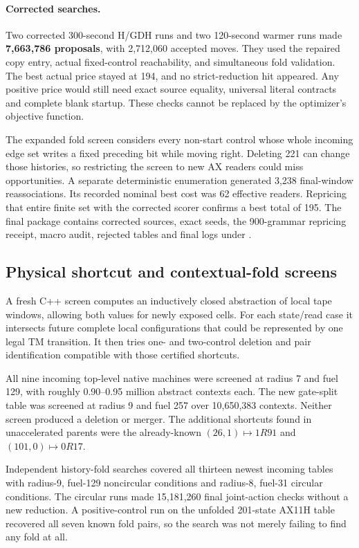 \documentclass[10pt,a4paper]{article}
\theoremstyle{definition}
\begin{document}
\paragraph{Corrected searches.}
Two corrected 300-second H/GDH runs and two 120-second warmer runs made
\textbf{7,663,786 proposals}, with 2,712,060 accepted moves. They used
the repaired copy entry, actual fixed-control reachability, and
simultaneous fold validation. The best actual price stayed at 194,
and no strict-reduction hit appeared. Any positive price would still
need exact source equality, universal literal contracts and complete
blank startup. These checks cannot be replaced by the optimizer's
objective function.

The expanded fold screen considers every non-start control whose whole
incoming edge set writes a fixed preceding bit while moving right.
Deleting 221 can change those histories, so restricting the screen to
new AX readers could miss opportunities. A separate deterministic
enumeration generated 3,238 final-window reassociations. Its recorded
nominal best cost was 62 effective readers. Repricing that entire finite
set with the corrected scorer confirms a best total of 195. The final package contains corrected
sources, exact seeds, the 900-grammar repricing receipt, macro audit,
rejected tables and final logs under .

\subsection{Physical shortcut and contextual-fold screens}

A fresh C++ screen computes an inductively closed abstraction of local
tape windows, allowing both values for newly exposed cells. For each
state/read case it intersects future complete local configurations that
could be represented by one legal TM transition. It then tries one- and
two-control deletion and pair identification compatible with those
certified shortcuts.

All nine incoming top-level native machines were screened at radius 7
and fuel 129, with roughly 0.90--0.95 million abstract contexts each.
The new gate-split table was screened at radius 9 and fuel 257 over
10,650,383 contexts. Neither screen produced a deletion or merger.
The additional shortcuts found in unaccelerated parents were the
already-known $(26,1)\mapsto1R91$ and $(101,0)\mapsto0R17$.

Independent history-fold searches covered all thirteen newest incoming
tables with radius-9, fuel-129 noncircular conditions and radius-8,
fuel-31 circular conditions. The circular runs made 15,181,260 final
joint-action checks without a new reduction. A positive-control run on
the unfolded 201-state AX11H table recovered all seven known fold pairs,
so the search was not merely failing to find any fold at all.
\end{document}
